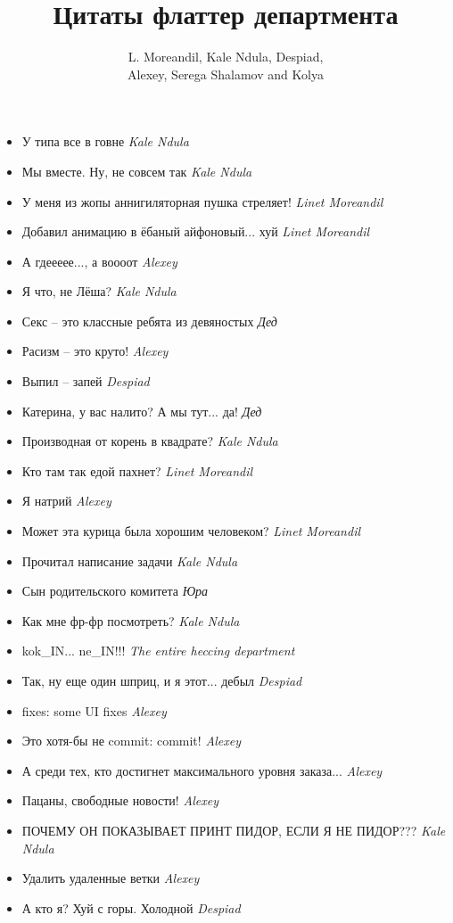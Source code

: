 \documentclass[11pt]{book}
\title{Цитаты флаттер департмента}
\author{L. Moreandil, Kale Ndula, Despiad,\\ Alexey, Serega Shalamov and Kolya}
\date{}
\newcommand{\entry}[2] {\large{\textmd{#1}} \textemdash \small{\emph{#2}}}
\newcommand{\kn}{Kale Ndula}
\newcommand{\lm}{Linet Moreandil}
\newcommand{\dd}{Despiad}
\newcommand{\al}{Alexey}
\begin{document}
\maketitle

\begin{itemize}[leftmargin=0cm]

\item \entry{У типа все в говне}{\kn}
\item \entry{Мы вместе. Ну, не совсем так}{\kn}
\item \entry{У меня из жопы аннигиляторная пушка стреляет!}{\lm}
\item \entry{Добавил анимацию в ёбаный айфоновый... хуй}{\lm}
\item \entry{А гдеееее..., а воооот}{\al}
\item \entry{Я что, не Лёша?}{\kn}
\item \entry{Секс -- это классные ребята из девяностых}{Дед}
\item \entry{Расизм -- это круто!}{\al}
\item \entry{Выпил -- запей}{\dd}
\item \entry{Катерина, у вас налито? А мы тут... да!}{Дед}
\item \entry{Производная от корень в квадрате?}{\kn}
\item \entry{Кто там так едой пахнет?}{\lm}
\item \entry{Я натрий}{\al}
\item \entry{Может эта курица была хорошим человеком?}{\lm}
\item \entry{Прочитал написание задачи}{\kn}
\item \entry{Сын родительского комитета}{Юра}
\item \entry{Как мне фр-фр посмотреть?}{\kn}
\item \entry{kok\_IN... ne\_IN!!!}{The entire heccing department}
\item \entry{Так, ну еще один шприц, и я этот... дебыл}{\dd}
\item \entry{fixes: some UI fixes}{\al}
\item \entry{Это хотя-бы не commit: commit!}{\al}
\item \entry{А среди тех, кто достигнет максимального уровня заказа...}{\al}
\item \entry{Пацаны, свободные новости!}{\al}
\item \entry{ПОЧЕМУ ОН ПОКАЗЫВАЕТ ПРИНТ ПИДОР, ЕСЛИ Я НЕ ПИДОР???}{\kn}
\item \entry{Удалить удаленные ветки}{\al}
\item \entry{А кто я? Хуй с горы. Холодной}{\dd}

\end{itemize}
\end{document}
